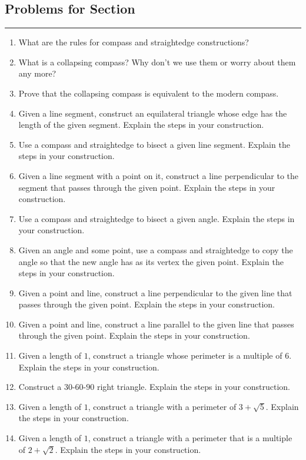 \subsection*{Problems for Section~\thesection}\hrule\vspace{1ex}
\begin{enumerate}
\item What are the rules for compass and straightedge constructions?
\item What is a collapsing compass? Why don't we use them or worry about them any more?
\item Prove that the collapsing compass is equivalent to the modern compass.
\item Given a line segment, construct an equilateral triangle whose edge has the length of the given segment. Explain the steps in your construction.
\item Use a compass and straightedge to bisect a given line segment. Explain the steps in your construction.
\item Given a line segment with a point on it, construct a line perpendicular to the segment that passes through the given point. Explain the steps in your construction.
\item Use a compass and straightedge to bisect a given angle. Explain the steps in your construction.
\item Given an angle and some point, use a compass and straightedge to copy the angle so that the new angle has as its vertex the given point. Explain the steps in your construction.
\item Given a point and line, construct a line perpendicular to the given line that passes through the given point. Explain the steps in your construction.
\item Given a point and line, construct a line parallel to the given line that passes through the given point. Explain the steps in your construction.
\item Given a length of $1$, construct a triangle whose perimeter is a
  multiple of $6$. Explain the steps in your construction.
\item Construct a $30$-$60$-$90$ right triangle. Explain the steps in your
  construction.
\item Given a length of $1$, construct a triangle with a perimeter of
  $3 + \sqrt{5}$. Explain the steps in your construction.
\item Given a length of $1$, construct a triangle with a perimeter that is a multiple of
  $2 + \sqrt{2}$. Explain the steps in your construction.

\end{enumerate}
